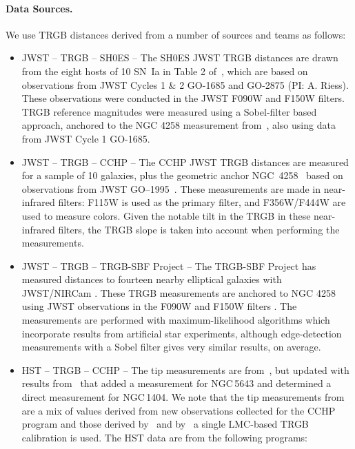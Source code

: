 \paragraph{Data Sources.}
We use TRGB distances derived from a number of sources and teams as follows: 
\begin{itemize}
\item JWST -- TRGB -- SH0ES --
The SH0ES {JWST} TRGB distances are drawn from the eight hosts of 10 SN~Ia in Table 2 of~\citep{2024ApJ...976..177L}, which are based on observations from {JWST} Cycles 1 \& 2 GO-1685 and GO-2875 (PI: A. Riess). These observations were conducted in the {JWST} {F090W} and {F150W} filters. TRGB reference magnitudes were measured using a Sobel-filter based approach, anchored to the NGC 4258 measurement from~\citet{2024ApJ...966...89A}, also using data from {JWST} Cycle 1 GO-1685.
\item JWST -- TRGB -- CCHP --
The CCHP JWST TRGB distances are measured for a sample of 10 galaxies, plus the geometric anchor NGC~4258~\citep{2025arXiv250311769H, 2025ApJ...985..203F} based on observations from JWST GO–1995~\citep{2021jwst.prop.1995F}. These measurements are made in near-infrared filters: F115W is used as the primary filter, and F356W/F444W are used to measure colors. Given the notable tilt in the TRGB in these near-infrared filters, the TRGB slope is taken into account when performing the measurements.
\item JWST -- TRGB -- TRGB-SBF Project -- The TRGB-SBF Project has measured distances to fourteen nearby elliptical galaxies with JWST/NIRCam \citep{2024ApJ...973...83A, 2025ApJ...982...26A}. These TRGB measurements are anchored to NGC 4258 using JWST observations in the  F090W and F150W filters \citep{2024ApJ...966...89A}. The measurements are performed with maximum-likelihood algorithms which incorporate results from artificial star experiments, although edge-detection measurements with a Sobel filter gives very similar results, on average.
\item HST -- TRGB -- CCHP --
The tip measurements are from~\citet{2019ApJ...882...34F}, but updated with results from~\citet{2021ApJ...915...34H} that added a measurement for NGC\,5643 and determined a direct measurement for NGC\,1404.
We note that the tip measurements from~\citet{2019ApJ...882...34F} are a mix of values derived from new observations collected for the CCHP program and those derived by~\citet{2017ApJ...836...74J} and by~\citet{2019ApJ...882...34F} a single LMC-based TRGB calibration is used. 
The HST data are from the following programs: 

\end{itemize}
